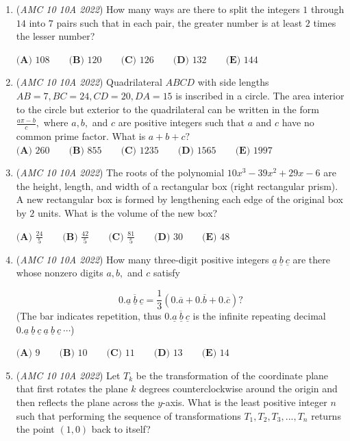 \begin{enumerate}
	\item (\textit{AMC 10 10A 2022}) How many ways are there to split the integers $1$ through $14$ into $7$ pairs such that in each pair, the greater number is at least $2$ times the lesser number?


 $\textbf{(A) } 108 \qquad \textbf{(B) } 120 \qquad \textbf{(C) } 126 \qquad \textbf{(D) } 132 \qquad \textbf{(E) } 144$


	\item (\textit{AMC 10 10A 2022}) Quadrilateral $ABCD$ with side lengths $AB=7, BC=24, CD=20, DA=15$ is inscribed in a circle. The area interior to the circle but exterior to the quadrilateral can be written in the form $\frac{a\pi-b}{c},$ where $a,b,$ and $c$ are positive integers such that $a$ and $c$ have no common prime factor. What is $a+b+c?$
$\textbf{(A) } 260 \qquad \textbf{(B) } 855 \qquad \textbf{(C) } 1235 \qquad \textbf{(D) } 1565 \qquad \textbf{(E) } 1997$


	\item (\textit{AMC 10 10A 2022}) The roots of the polynomial $10x^3 - 39x^2 + 29x - 6$ are the height, length, and width of a rectangular box (right rectangular prism). A new rectangular box is formed by lengthening each edge of the original box by $2$ units. What is the volume of the new box?


 $\textbf{(A) } \frac{24}{5} \qquad \textbf{(B) } \frac{42}{5} \qquad \textbf{(C) } \frac{81}{5} \qquad \textbf{(D) } 30 \qquad \textbf{(E) } 48$


	\item (\textit{AMC 10 10A 2022}) How many three-digit positive integers $\underline{a} \ \underline{b} \ \underline{c}$ are there whose nonzero digits $a,b,$ and $c$ satisfy

 \[0.\overline{\underline{a}~\underline{b}~\underline{c}} = \frac{1}{3} (0.\overline{a} + 0.\overline{b} + 0.\overline{c})?\]
(The bar indicates repetition, thus $0.\overline{\underline{a}~\underline{b}~\underline{c}}$ is the infinite repeating decimal $0.\underline{a}~\underline{b}~\underline{c}~\underline{a}~\underline{b}~\underline{c}~\cdots$)


 $\textbf{(A) } 9 \qquad \textbf{(B) } 10 \qquad \textbf{(C) } 11 \qquad \textbf{(D) } 13 \qquad \textbf{(E) } 14$


	\item (\textit{AMC 10 10A 2022}) Let $T_k$ be the transformation of the coordinate plane that first rotates the plane $k$ degrees counterclockwise around the origin and then reflects the plane across the $y$-axis. What is the least positive integer $n$ such that performing the sequence of transformations $T_1, T_2, T_3,...,T_n$ returns the point $(1, 0)$ back to itself?



\end{enumerate}
